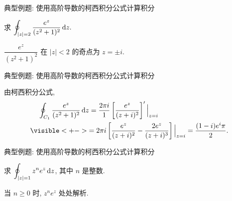 \begin{frame}{典型例题: 使用高阶导数的柯西积分公式计算积分}
\onslide<+->
\begin{example}
求 $\displaystyle\oint_{|z|=2}\frac{e^z}{(z^2+1)^2}\,\mathrm{d} z.$
\end{example}
\onslide<+->
\begin{solution}
$\dfrac{e^z}{(z^2+1)^2}$ 在 $|z|<2$ 的奇点为 $z=\pm i$.
\end{solution}
\end{frame}


\begin{frame}{典型例题: 使用高阶导数的柯西积分公式计算积分}
\onslide<+->
\begin{solutionc}
由柯西积分公式,
\begin{align*}
&\peq\oint_{C_1}\frac{e^z}{(z^2+1)^2}\diff z
=\frac{2\pi i}{1}\left[\frac{e^z}{(z+i)^2}\right]'\Big|_{z=i}\\
&\visible<+->{=2\pi i\left[\frac{e^z}{(z+i)^2}-\frac{2e^z}{(z+i)^3}\right]\Big|_{z=i}
=\frac{(1-i)e^i\pi}2.}
\end{align*}

\vspace{-1.7\baselineskip}
\end{solutionc}
\end{frame}


\begin{frame}{典型例题: 使用高阶导数的柯西积分公式计算积分}
\onslide<+->
\begin{example}
求 $\displaystyle\oint_{|z|=1}z^ne^z\,\mathrm{d} z$, 其中 $n$ 是整数.
\end{example}
\onslide<+->
\begin{solution}
当 $n\ge 0$ 时, $z^ne^z$ 处处解析.

\vspace{-\baselineskip}
\end{solution}
\end{frame}


